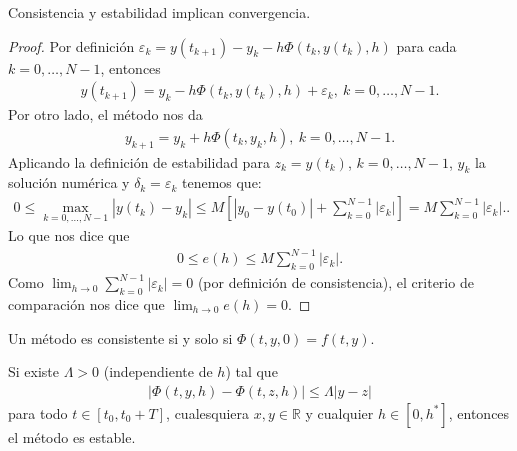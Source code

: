 \begin{teo}
    Consistencia y estabilidad implican convergencia.
\end{teo}

\begin{proof}
    Por definición $\varepsilon_k = y(t_{k+1}) - y_k - h \Phi(t_k,y(t_k),h)$ para cada $k = 0,\ldots,N-1$, entonces
    \begin{align*}
        y(t_{k+1}) =  y_k - h \Phi(t_k,y(t_k),h) + \varepsilon_k, \ k = 0,\ldots,N-1.
    \end{align*}
    Por otro lado, el método nos da
    \begin{align*}
        y_{k+1} = y_k + h\Phi(t_k,y_k,h), \ k = 0,\ldots,N-1.
    \end{align*}
    Aplicando la definición de estabilidad para $z_k = y(t_k)$, $k = 0,\ldots,N-1$, $y_k$ la solución numérica y $\delta_k = \varepsilon_k$ tenemos que:
    \begin{align*}
        0 \leq \max_{k=0,\ldots,N-1} |y(t_k) - y_k| \leq M \left[ |y_0 - y(t_0)| + \sum_{k=0}^{N-1} |\varepsilon_k| \right]  = M\sum_{k=0}^{N-1} |\varepsilon_k| ..
    \end{align*}
    Lo que nos dice que
    \begin{align*}
        0 \leq e(h) \leq M\sum_{k=0}^{N-1} |\varepsilon_k| .
    \end{align*}
    Como $\lim_{h \to 0} \sum_{k=0}^{N-1} |\varepsilon_k| = 0$ (por definición de consistencia), el criterio de comparación nos dice que $\lim_{h \to 0} e(h) = 0$.
\end{proof}

\begin{teo}
    Un método es consistente si y solo si $\Phi(t,y,0) = f(t,y)$.
\end{teo}

\begin{teo}
    Si existe $\Lambda > 0$ (independiente de $h$) tal que
    \begin{align*}
        |\Phi(t,y,h) - \Phi(t,z,h)| \leq \Lambda|y-z|
    \end{align*}
    para todo $t \in [t_0,t_0+T]$, cualesquiera $x,y \in \mathbb{R}$ y cualquier $h \in [0,h^*]$, entonces el método es estable.
\end{teo}


